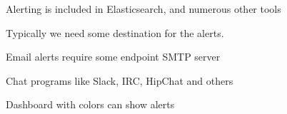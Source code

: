 \documentclass[Screen16to9,17pt]{foils}
\begin{document}











\begin{list2}
\item Alerting is included in Elasticsearch, and numerous other tools
\item Typically we need some destination for the alerts.
\item Email alerts require some endpoint SMTP server
\item Chat programs like Slack, IRC, HipChat and others
\item Dashboard with colors can show alerts
\end{list2}




\slidenext{}
\end{document}
